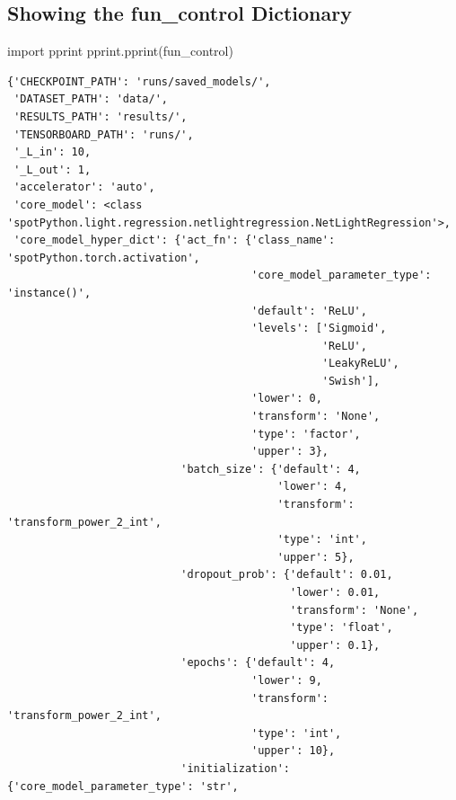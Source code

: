 \documentclass[
  letterpaper,
  DIV=11,
  numbers=noendperiod]{scrreprt}
\newenvironment{Shaded}{\begin{snugshade}}{\end{snugshade}}
\newcommand{\ImportTok}[1]{\textcolor[rgb]{0.00,0.46,0.62}{#1}}
\newcommand{\NormalTok}[1]{\textcolor[rgb]{0.00,0.23,0.31}{#1}}
\begin{document}
\subsection{Showing the fun\_control
Dictionary}\label{sec-show-fun-control-31}

\begin{Shaded}
\begin{Highlighting}[]
\ImportTok{import}\NormalTok{ pprint}
\NormalTok{pprint.pprint(fun\_control)}
\end{Highlighting}
\end{Shaded}

\begin{verbatim}
{'CHECKPOINT_PATH': 'runs/saved_models/',
 'DATASET_PATH': 'data/',
 'RESULTS_PATH': 'results/',
 'TENSORBOARD_PATH': 'runs/',
 '_L_in': 10,
 '_L_out': 1,
 'accelerator': 'auto',
 'core_model': <class 'spotPython.light.regression.netlightregression.NetLightRegression'>,
 'core_model_hyper_dict': {'act_fn': {'class_name': 'spotPython.torch.activation',
                                      'core_model_parameter_type': 'instance()',
                                      'default': 'ReLU',
                                      'levels': ['Sigmoid',
                                                 'ReLU',
                                                 'LeakyReLU',
                                                 'Swish'],
                                      'lower': 0,
                                      'transform': 'None',
                                      'type': 'factor',
                                      'upper': 3},
                           'batch_size': {'default': 4,
                                          'lower': 4,
                                          'transform': 'transform_power_2_int',
                                          'type': 'int',
                                          'upper': 5},
                           'dropout_prob': {'default': 0.01,
                                            'lower': 0.01,
                                            'transform': 'None',
                                            'type': 'float',
                                            'upper': 0.1},
                           'epochs': {'default': 4,
                                      'lower': 9,
                                      'transform': 'transform_power_2_int',
                                      'type': 'int',
                                      'upper': 10},
                           'initialization': {'core_model_parameter_type': 'str',

\end{verbatim}
\end{document}
